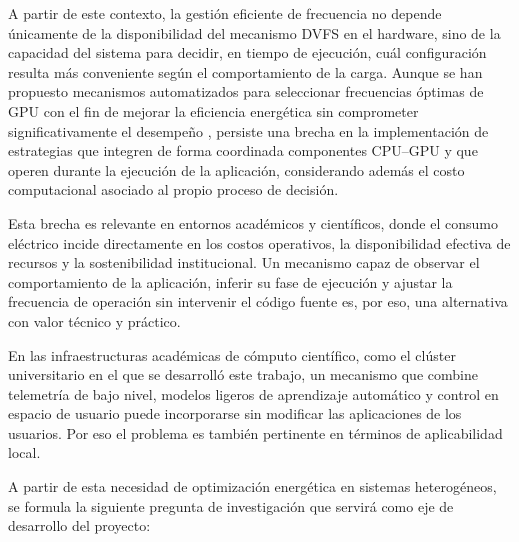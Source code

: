 A partir de este contexto, la gestión eficiente de frecuencia no depende únicamente de la disponibilidad del mecanismo DVFS en el hardware, sino de la capacidad del sistema para decidir, en tiempo de ejecución, cuál configuración resulta más conveniente según el comportamiento de la carga. Aunque se han propuesto mecanismos automatizados para seleccionar frecuencias óptimas de GPU con el fin de mejorar la eficiencia energética sin comprometer significativamente el desempeño \cite{Ali2023}, persiste una brecha en la implementación de estrategias que integren de forma coordinada componentes CPU--GPU y que operen durante la ejecución de la aplicación, considerando además el costo computacional asociado al propio proceso de decisión.

Esta brecha es relevante en entornos académicos y científicos, donde el consumo eléctrico incide directamente en los costos operativos, la disponibilidad efectiva de recursos y la sostenibilidad institucional. Un mecanismo capaz de observar el comportamiento de la aplicación, inferir su fase de ejecución y ajustar la frecuencia de operación sin intervenir el código fuente es, por eso, una alternativa con valor técnico y práctico.

En las infraestructuras académicas de cómputo científico, como el clúster universitario en el que se desarrolló este trabajo, un mecanismo que combine telemetría de bajo nivel, modelos ligeros de aprendizaje automático y control en espacio de usuario puede incorporarse sin modificar las aplicaciones de los usuarios. Por eso el problema es también pertinente en términos de aplicabilidad local.

A partir de esta necesidad de optimización energética en sistemas heterogéneos, se formula la siguiente pregunta de investigación que servirá como eje de desarrollo del proyecto:

\vspace{0.5cm}

\noindent{}

\vspace{0.5cm}

